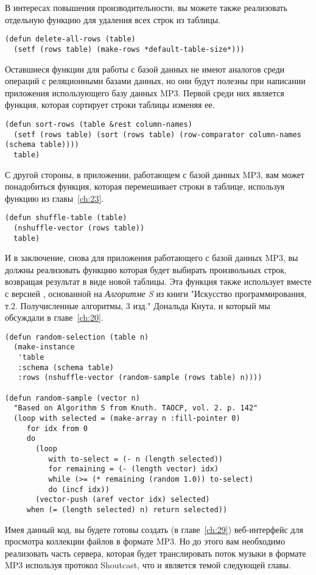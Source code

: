 В интересах повышения производительности, вы можете также реализовать отдельную функцию
для удаления всех строк из таблицы.

\begin{lstlisting}
(defun delete-all-rows (table)
  (setf (rows table) (make-rows *default-table-size*)))
\end{lstlisting}

Оставшиеся функции для работы с базой данных не имеют аналогов среди операций с
реляционными базами данных, но они будут полезны при написании приложения использующего
базу данных MP3.  Первой среди них является функция, которая сортирует строки таблицы
изменяя ее.

\begin{lstlisting}
(defun sort-rows (table &rest column-names)
  (setf (rows table) (sort (rows table) (row-comparator column-names (schema table))))
  table)
\end{lstlisting}

С другой стороны, в приложении, работающем с базой данных MP3, вам может понадобиться
функция, которая перемешивает строки в таблице, используя функцию 
из главы~\ref{ch:23}.

\begin{lstlisting}
(defun shuffle-table (table)
  (nshuffle-vector (rows table))
  table)
\end{lstlisting}

И в заключение, снова для приложения работающего с базой данных MP3, вы должны реализовать
функцию которая будет выбирать  произвольных строк, возвращая результат в виде
новой таблицы.  Эта функция также использует  вместе с версией
, основанной на \textit{Алгоритме S} из книги "Искусство
программирования, т.2.  Получисленные алгоритмы, 3 изд." Дональда Кнута, и который мы
обсуждали в главе~\ref{ch:20}.

\begin{lstlisting}
(defun random-selection (table n)
  (make-instance
   'table
   :schema (schema table)
   :rows (nshuffle-vector (random-sample (rows table) n))))

(defun random-sample (vector n)
  "Based on Algorithm S from Knuth. TAOCP, vol. 2. p. 142"
  (loop with selected = (make-array n :fill-pointer 0)
     for idx from 0
     do
       (loop
          with to-select = (- n (length selected))
          for remaining = (- (length vector) idx)
          while (>= (* remaining (random 1.0)) to-select)
          do (incf idx))
       (vector-push (aref vector idx) selected)
     when (= (length selected) n) return selected))
\end{lstlisting}

Имея данный код, вы будете готовы создать (в главе~\ref{ch:29}) веб-интерфейс для
просмотра коллекции файлов в формате MP3.  Но до этого вам необходимо реализовать часть
сервера, которая будет транслировать поток музыки в формате MP3 используя протокол
Shoutcast, что и является темой следующей главы.

